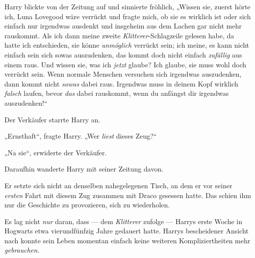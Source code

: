 Harry blickte von der Zeitung auf und sinnierte fröhlich,
„Wissen sie, zuerst hörte ich, Luna Lovegood wäre verrückt und fragte mich, ob sie es wirklich ist oder sich einfach nur irgendwas ausdenkt und insgeheim aus dem Lachen gar nicht mehr rauskommt. Als ich dann meine zweite \emph{Klitterer}-Schlagzeile gelesen habe, da hatte ich entschieden, sie könne \emph{unmöglich} verrückt sein; ich meine, es kann nicht einfach sein sich sowas auszudenken, das kommt doch nicht einfach \emph{zufällig} aus einem raus. Und wissen sie, was ich \emph{jetzt} glaube? Ich glaube, sie muss wohl doch verrückt sein. Wenn normale Menschen versuchen sich irgendwas auszudenken, dann kommt nicht \emph{sowas} dabei raus. Irgendwas muss in deinem Kopf wirklich \emph{falsch} laufen, bevor \emph{das} dabei rauskommt, wenn du anfängst dir irgendwas auszudenken!“

Der Verkäufer starrte Harry an.

„Ernsthaft“, fragte Harry.
„Wer \emph{liest} dieses Zeug?“

„Na sie“, erwiderte der Verkäufer.

Daraufhin wanderte Harry mit seiner Zeitung davon.

Er setzte sich nicht an denselben nahegelegenen Tisch, an dem er vor seiner \emph{ersten} Fahrt mit diesem Zug zusammen mit Draco gesessen hatte. Das schien ihm nur die Geschichte zu provozieren, sich zu wiederholen.

Es lag nicht \emph{nur} daran, dass — dem \emph{Klitterer} zufolge — Harrys erste Woche in Hogwarts etwa vierundfünfzig Jahre gedauert hatte. Harrys bescheidener Ansicht nach konnte sein Leben momentan einfach keine weiteren Kompliziertheiten mehr \emph{gebrauchen}.


